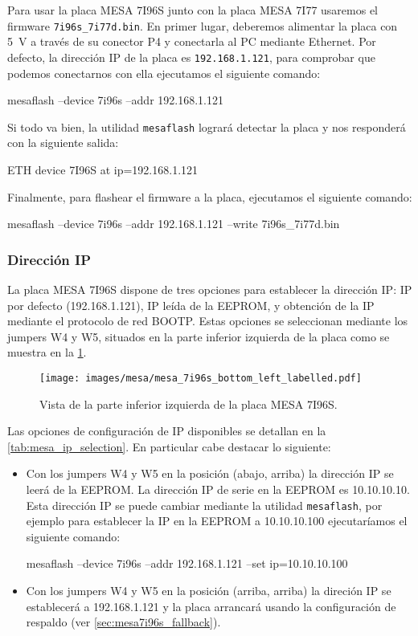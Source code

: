 \documentclass[english,spanish,a4paper,11pt]{article}
\begin{document}
Para usar la placa MESA 7I96S junto con la placa MESA 7I77 usaremos el firmware \texttt{7i96s\_7i77d.bin}. En primer lugar, deberemos alimentar la placa con \qty{5}{\V} a través de su conector P4 y conectarla al PC mediante Ethernet. Por defecto, la dirección IP de la placa es \texttt{192.168.1.121}, para comprobar que podemos conectarnos con ella ejecutamos el siguiente comando:
%
\begin{listingbox}
mesaflash --device 7i96s --addr 192.168.1.121
\end{listingbox}

Si todo va bien, la utilidad \texttt{mesaflash} logrará detectar la placa y nos responderá con la siguiente salida:
%
\begin{listingbox}
ETH device 7I96S at ip=192.168.1.121
\end{listingbox}

Finalmente, para flashear el firmware a la placa, ejecutamos el siguiente comando:
%
\begin{listingbox}
mesaflash --device 7i96s --addr 192.168.1.121 --write 7i96s_7i77d.bin
\end{listingbox}


\subsubsection{Dirección IP}

La placa MESA 7I96S dispone de tres opciones para establecer la dirección IP: IP por defecto (192.168.1.121), IP leída de la EEPROM, y obtención de la IP mediante el protocolo de red BOOTP. Estas opciones se seleccionan mediante los jumpers W4 y W5, situados en la 
parte inferior izquierda de la placa como se muestra en la \cref{fig:mesa_ip_selection}.

\begin{figure}[!ht]
    \centering
    \texttt{[image: images/mesa/mesa\_7i96s\_bottom\_left\_labelled.pdf]}
    \caption{Vista de la parte inferior izquierda de la placa MESA 7I96S.}
    \label{fig:mesa_ip_selection}
\end{figure}

Las opciones de configuración de IP disponibles se detallan en la \cref{tab:mesa_ip_selection}. En particular cabe destacar lo siguiente:
\begin{itemize}
    \item Con los jumpers W4 y W5 en la posición (abajo, arriba) la dirección IP se leerá de la EEPROM. La dirección IP de serie en la EEPROM es 10.10.10.10. Esta dirección IP se puede cambiar mediante la utilidad \texttt{mesaflash}, por ejemplo para establecer la IP en la EEPROM a 10.10.10.100 ejecutaríamos el siguiente comando:
\begin{listingbox}
mesaflash --device 7i96s --addr 192.168.1.121 --set ip=10.10.10.100
\end{listingbox}

    \item Con los jumpers W4 y W5 en la posición (arriba, arriba) la direción IP se establecerá a 192.168.1.121 y la placa arrancará usando la configuración de respaldo (ver \cref{sec:mesa7i96s_fallback}).
\end{itemize}
\end{document}
